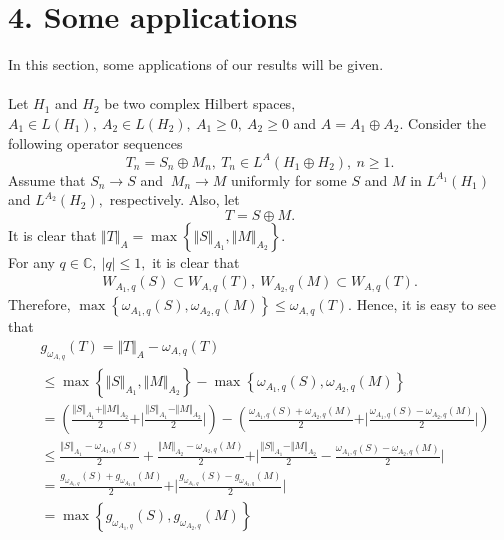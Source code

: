\documentclass[preprint,12pt,3p]{elsarticle}
\begin{document}
\section*{\normalsize{4. Some applications}}
In this section, some applications of our results will be given.  \\ \\
Let $ H_{1} $ and $ H_{2} $ be two complex Hilbert spaces, $ A_{1}\in L(H_{1}), \  A_{2}\in L(H_{2}), \ A_{1}\geq 0, \ A_{2}\geq 0 $ and $ A=A_{1}\oplus A_{2}. $ Consider the following operator sequences 
$$
T_n= S_{n}\oplus M_{n}, \ T_{n}\in L^{A}\left( H_{1}\oplus H_{2} \right), \ n\geq 1.
$$
Assume that $ S_{n}\rightarrow S$ and $\ M_{n}\rightarrow M $  uniformly for some $ S $ and $ M $ in $ L^{A_{1}}(H_{1}) $ and $ L^{A_{2}}(H_{2}),  $ respectively. Also, let 
$$
T=S\oplus M.
$$
It is clear that $ \Vert T \Vert_{A}=\max \left\lbrace \Vert S \Vert_{A_{1}}, \Vert M \Vert_{A_{2}} \right\rbrace . $ \\
For any $ q\in \mathbb{C}, \ \vert q \vert \leq 1, $ it is clear that 
\begin{eqnarray}
\label{equ3}
W_{A_{1},q}(S)\subset W_{A,q}(T), \ W_{A_{2},q}(M)\subset W_{A,q}(T).
\end{eqnarray}
Therefore, $ \max \left\lbrace \omega_{A_{1},q}(S), \omega_{A_{2},q}(M) \right\rbrace \leq \omega_{A,q}(T).  $ Hence, it is easy to see that 
\begin{align}
 &g_{\omega_{A,q}}(T)  =  \Vert T \Vert_{A}-\omega_{A,q}(T)\nonumber \\
& \leq \max \left\lbrace \Vert S \Vert_{A_{1}}, \Vert M \Vert_{A_{2}} \right\rbrace - \max \left\lbrace \omega_{A_{1},q}(S), \omega_{A_{2},q}(M) \right\rbrace  \nonumber \\
& =  \left( \frac{\Vert S \Vert_{A_{1}}+\Vert M \Vert_{A_{2}}}{2} + \vert \frac{\Vert S \Vert_{A_{1}}-\Vert M \Vert_{A_{2}}}{2} \vert \right) - \left( \frac{\omega_{A_{1},q}(S)+ \omega_{A_{2},q}(M)}{2} + \vert \frac{\omega_{A_{1},q}(S)- \omega_{A_{2},q}(M)}{2} \vert \right) \nonumber \\
& \leq  \frac{\Vert S \Vert_{A_{1}} - \omega_{A_{1},q}(S)}{2}+ \frac{\Vert M \Vert_{A_{2}} - \omega_{A_{2},q}(M)}{2}+ \vert  \frac{\Vert S \Vert_{A_{1}}-\Vert M \Vert_{A_{2}}}{2} - \frac{\omega_{A_{1},q}(S)- \omega_{A_{2},q}(M)}{2} \vert \nonumber \\
& =  \frac{g_{\omega_{A_{1},q}}(S)+g_{\omega_{A_{2},q}}(M)}{2} + \vert \frac{g_{\omega_{A_{1},q}}(S)-g_{\omega_{A_{2},q}}(M)}{2} \vert \nonumber \\
& =  \max \left\lbrace g_{\omega_{A_{1},q}}(S),g_{\omega_{A_{2},q}}(M)  \right\rbrace  \nonumber   
\end{align}
\end{document}
